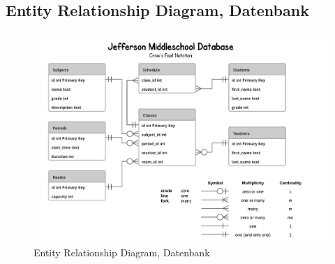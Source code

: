 \documentclass[11pt, a4paper]{article}
\begin{document}
    \subsection{Entity Relationship Diagram, Datenbank}
      \begin{figure}[h!]
        \includegraphics[width=\linewidth]{fig/ERD_JeffersonMiddleSchool.pdf}
        \caption{Entity Relationship Diagram, Datenbank}
        \label{fig:classdiagram}
      \end{figure}
      \newpage
\end{document}
